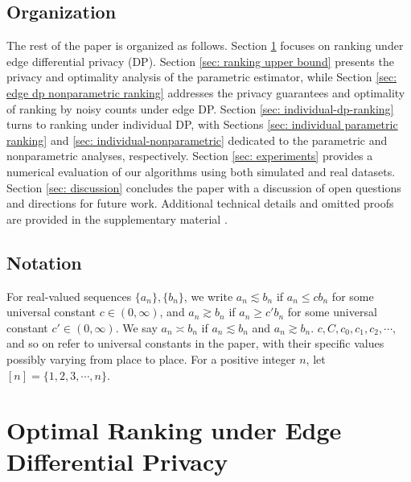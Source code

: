 \documentclass[letterpaper,12pt]{article}
\numberwithin{equation}{section}
\theoremstyle{plain}
\numberwithin{Theorem}{section}
\numberwithin{corollary}{section}
\numberwithin{proposition}{section}
\numberwithin{Lemma}{section}
{
	\theoremstyle{definition}
	\newtheorem{Definition}{Definition}
	\newtheorem{example}{Example}
	\numberwithin{example}{section}
	\newtheorem{fact}{Fact}
	\numberwithin{fact}{section}
	\newtheorem{remark}{Remark}
}
\newcommand{\1}{\mathbbm{1}}
\begin{document}
\vspace{-5mm}
\subsection{Organization}

The rest of the paper is organized as follows. Section \ref{sec: edge dp ranking} focuses on ranking under edge differential privacy (DP). Section \ref{sec: ranking upper bound} presents the privacy and optimality analysis of the parametric estimator, while Section \ref{sec: edge dp nonparametric ranking} addresses the privacy guarantees and optimality of ranking by noisy counts under edge DP. Section \ref{sec: individual-dp-ranking} turns to ranking under individual DP, with Sections \ref{sec: individual parametric ranking} and \ref{sec: individual-nonparametric} dedicated to the parametric and nonparametric analyses, respectively. Section \ref{sec: experiments} provides a numerical evaluation of our algorithms using both simulated and real datasets. Section \ref{sec: discussion} concludes the paper with a discussion of open questions and directions for future work. Additional technical details and omitted proofs are provided in the supplementary material \cite{cai2023optimal}.

\vspace{-5mm}
\subsection{Notation}

 For real-valued sequences $\{a_n\}, \{b_n\}$, we write $a_n \lesssim b_n$ if $a_n \leq cb_n$ for some universal constant $c \in (0, \infty)$, and $a_n \gtrsim b_n$ if $a_n \geq c'b_n$ for some universal constant $c' \in (0, \infty)$.  We say $a_n \asymp b_n$ if $a_n \lesssim b_n$ and $a_n \gtrsim b_n$. $c, C, c_0, c_1, c_2, \cdots, $ and so on refer to universal constants in the paper, with their specific values possibly varying from place to place. For a positive integer $n$, let $[n] = \{1, 2, 3, \cdots, n\}$.







\vspace{-5mm}
\section{Optimal Ranking under Edge Differential Privacy}\label{sec: edge dp ranking}
\vspace{-5mm}
\end{document}
